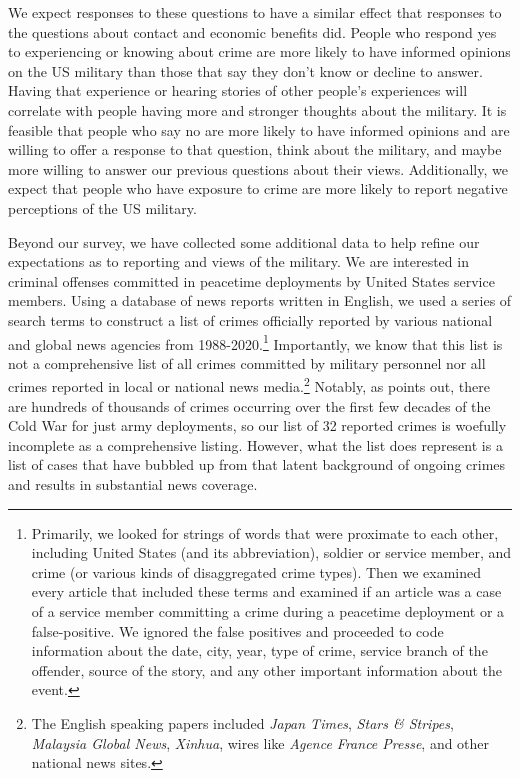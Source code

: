 We expect responses to these questions to have a similar effect that responses to the questions about contact and economic benefits did. People who respond yes to experiencing or knowing about crime are more likely to have informed opinions on the US military than those that say they don't know or decline to answer. Having that experience or hearing stories of other people's experiences will correlate with people having more and stronger thoughts about the military. It is feasible that people who say no are more likely to have informed opinions and are willing to offer a response to that question, think about the military, and maybe more willing to answer our previous questions about their views. Additionally, we expect that people who have exposure to crime are more likely to report negative perceptions of the US military. 

Beyond our survey, we have collected some additional data to help refine our expectations as to reporting and views of the military. We are interested in criminal offenses committed in peacetime deployments by United States service members. Using a database of news reports written in English, we used a series of search terms to construct a list of crimes officially reported by various national and global news agencies from 1988-2020.\footnote{Primarily, we looked for strings of words that were proximate to each other, including United States (and its abbreviation), soldier or service member, and crime (or various kinds of disaggregated crime types). Then we examined every article that included these terms and examined if an article was a case of a service member committing a crime during a peacetime deployment or a false-positive. We ignored the false positives and proceeded to code information about the date, city, year, type of crime, service branch of the offender, source of the story, and any other important information about the event.} Importantly, we know that this list is not a comprehensive list of all crimes committed by military personnel nor all crimes reported in local or national news media.\footnote{The English speaking papers included \textit{Japan Times}, \textit{Stars \& Stripes}, \textit{Malaysia Global News}, \textit{Xinhua}, wires like \textit{Agence France Presse}, and other national news sites.} Notably, as  points out, there are hundreds of thousands of crimes occurring over the first few decades of the Cold War for just army deployments, so our list of 32 reported crimes is woefully incomplete as a comprehensive listing. However, what the list does represent is a list of cases that have bubbled up from that latent background of ongoing crimes and results in substantial news coverage. 

